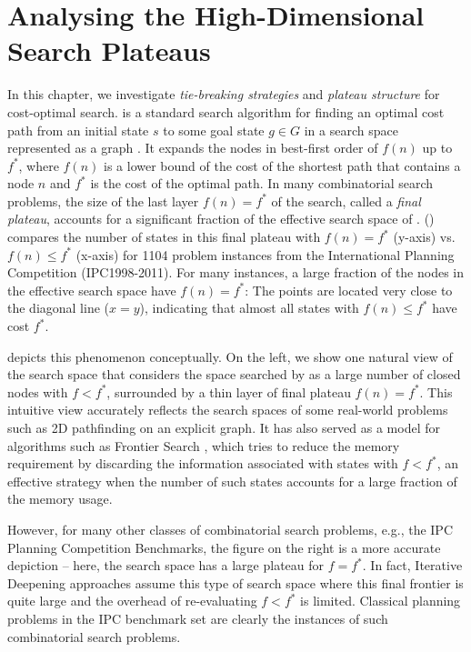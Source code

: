 \chapter[High-Dimensional Search Plateaus]{Analysing the High-Dimensional Search Plateaus}

\label{chap:plateaus}

In this chapter, we investigate \emph{tie-breaking strategies} and \emph{plateau structure} for cost-optimal \astar search.
\astar is a standard search algorithm for finding an optimal cost path from an initial state $s$ to some goal
state $g \in G$ in a search space represented as a graph \cite{hart1968formal}.
It expands the nodes in best-first order of $f(n)$ up to $f^*$,
where $f(n)$ is a lower bound of the cost of the shortest path that contains a node $n$ and $f^*$ is
 the cost of the optimal path.
% 
In many combinatorial search problems, the size of the last layer $f(n)=f^*$ of the search, called a
 \emph{final plateau},
accounts for a significant fraction of the effective search space of \astar.  
() compares the number of states in this final plateau with $f(n) = f^*$ (y-axis)
vs. $f(n) \leq f^*$ (x-axis) for 1104 problem instances from the International Planning Competition (IPC1998-2011).
For many instances, a large fraction of the nodes in the effective search space have $f(n)=f^*$: The points
are located very close to the diagonal line ($x=y$), indicating that almost all states with $f(n) \leq f^*$ have cost
$f^*$.

 depicts this phenomenon conceptually.
% 
On the left, we show 
one natural  %
view of the search space that considers the space searched by \astar as
a large number of closed nodes with $f<f^*$, surrounded by
a thin layer of final plateau $f(n)=f^*$.  This intuitive view
accurately reflects the search spaces of some real-world problems such as 2D pathfinding on an explicit
graph.
% 
It has also served as a model for algorithms such as Frontier Search \cite{korf1999divide,korf2000divide},
which tries to reduce the memory requirement by discarding the information associated with states with $f<f^*$,
 an effective strategy when the number of such states accounts for a large fraction of the memory usage.
 
However, for many other classes of combinatorial search problems, e.g., the IPC Planning Competition Benchmarks, 
the figure on the right is a more accurate depiction -- here, the  search space has a large plateau for $f=f^*$.
In fact, Iterative Deepening approaches \cite{korf1985depth} assume this type of search space
where this final frontier is quite large and the overhead of re-evaluating $f<f^*$ is limited.
Classical planning problems in the IPC benchmark set are clearly the instances of such combinatorial search problems.

